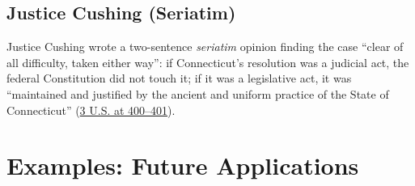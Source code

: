 \documentclass[12pt]{article}
\begin{document}
\subsection{Justice Cushing (Seriatim)}

Justice Cushing wrote a two-sentence \textit{seriatim} opinion finding the case ``clear of all difficulty, taken either way'': if Connecticut's resolution was a judicial act, the federal Constitution did not touch it; if it was a legislative act, it was ``maintained and justified by the ancient and uniform practice of the State of Connecticut'' (\href{https://supreme.justia.com/cases/federal/us/3/386/}{3 U.S. at 400--401}).

\section{Examples: Future Applications}
\end{document}
